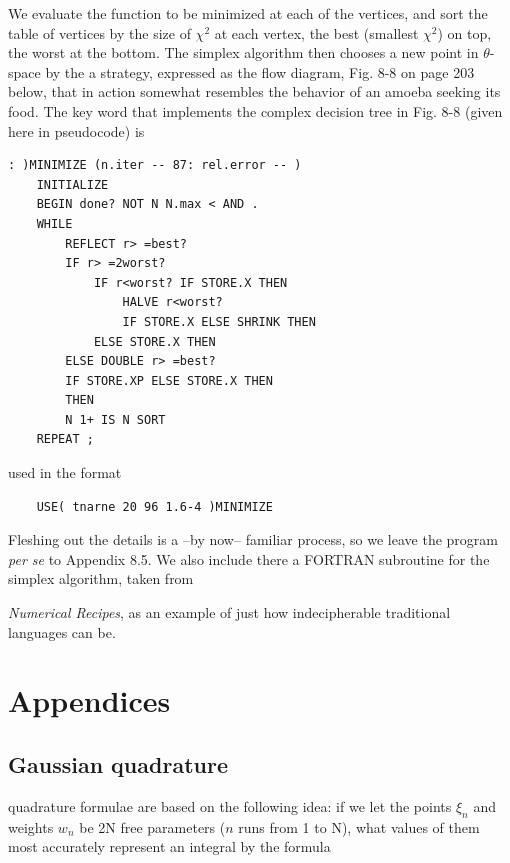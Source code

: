 We evaluate the function to be minimized at each of the vertices, and sort the table of vertices by the size of $\chi^{2}$ at each vertex, the best (smallest $\chi^{2}$) on top, the worst at the bottom. The simplex algorithm then chooses a new point in $\theta$-space by the a strategy, expressed as the ﬂow diagram, Fig. 8-8 on page 203 below, that in action somewhat resembles the behavior of an amoeba seeking its food. The key word  that implements the complex decision tree in Fig. 8-8 (given here in pseudocode) is

\begin{lstlisting}
: )MINIMIZE (n.iter -- 87: rel.error -- )
    INITIALIZE
    BEGIN done? NOT N N.max < AND .
    WHILE
        REFLECT r> =best?
        IF r> =2worst?
            IF r<worst? IF STORE.X THEN
                HALVE r<worst?
                IF STORE.X ELSE SHRINK THEN
            ELSE STORE.X THEN
        ELSE DOUBLE r> =best?
        IF STORE.XP ELSE STORE.X THEN
        THEN
        N 1+ IS N SORT
    REPEAT ;
\end{lstlisting}

used in the format

\begin{lstlisting}
    USE( tnarne 20 96 1.6-4 )MINIMIZE
\end{lstlisting}

Fleshing out the details is a --by now-- familiar process, so we leave the program \textit{per se} to Appendix 8.5. We also include there a FORTRAN subroutine for the simplex algorithm, taken from



\textit{Numerical Recipes}, as an example of just how indecipherable traditional languages can be.

\section{Appendices}

\subsection{Gaussian quadrature}

 quadrature formulae are based on the following idea: if we let the points $\xi_{n}$ and weights $w_{n}$ be 2N free parameters ($n$ runs from 1 to N), what values of them most accurately represent an integral by the formula


